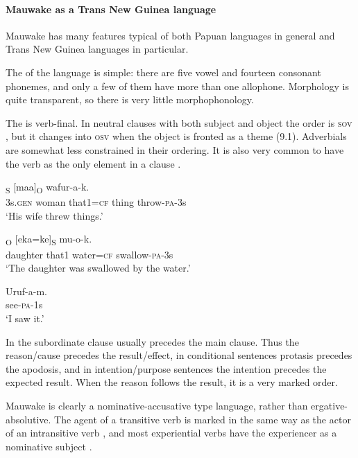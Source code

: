 \paragraph[Mauwake as a Trans New Guinea language]{Mauwake as a Trans New Guinea language}
Mauwake has many features typical of both Papuan languages in general and Trans New Guinea languages in particular. 

The  of the language is simple: there are five vowel and fourteen consonant phonemes, and only a few of them have more than one allophone.  Morphology is quite transparent, so there is very little morphophonology.

The   is verb-final. In neutral clauses with both subject and object the order is \textsc{sov} , but it changes into \textsc{osv} when the object is fronted  as a theme (9.1).  Adverbials are somewhat less constrained in their ordering. It is also very common to have the verb as the only element in a clause . 

\ea%
\label{ex:1:x656}
\gll [Ona  emeria  nain=ke]\textsubscript{S} [maa]\textsubscript{O} wafur-a-k. \\
 3s.\textsc{gen} woman  that1=\textsc{cf}  thing  throw-\textsc{pa}-3s \\
\glt `His wife threw things.'
\z


\ea%
\label{ex:1:x657}
\textsubscript{O} [eka=ke]\textsubscript{S} mu-o-k. \\
 daughter  that1  water=\textsc{cf} swallow-\textsc{pa}-3s     \\
\glt `The daughter was swallowed by the water.'
\z


\ea%
\label{ex:1:x659}
\gll Uruf-a-m. \\
 see-\textsc{pa}-1s     \\
\glt `I saw it.'
\z


In  the subordinate clause usually precedes the main clause.  Thus the reason/cause precedes the result/effect, in conditional sentences protasis precedes the apodosis, and in intention/purpose sentences the intention precedes the expected result. When the reason follows the result, it is a very marked order.

Mauwake is clearly a nominative-accusative type language, rather than ergative-absolutive. The agent of a transitive verb  is marked in the same way as the actor of an intransitive verb , and most experiential verbs have the experiencer as a nominative subject .

